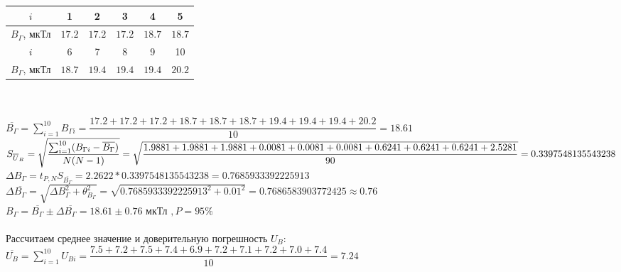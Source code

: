 \begin{tabular}{|c|c|c|c|c|c|}
	\hline
	$ i $        & 1 & 2 & 3 & 4 & 5 \\
	\hline
	$ B_\Gamma $, мкТл & $ 17.2 $ & $ 17.2 $ & $ 17.2 $ & $ 18.7 $ & $ 18.7 $ \\
	\hline
	$ i $        & 6 & 7 & 8 & 9 & 10 \\
	\hline
	$ B_\Gamma $, мкТл & $ 18.7 $ & $ 19.4 $ & $ 19.4 $ & $ 19.4 $ & $ 20.2 $ \\
	\hline
\end{tabular}
\\ 
\\

$ 
\overline{B_{\Gamma}}= 
\sum_{i=1}^{10} B_{\Gamma i} = 
\dfrac{17.2 + 17.2 + 17.2 + 18.7 + 18.7 + 18.7 + 19.4 + 19.4 + 19.4 + 20.2}{10} 
= 18.61
$
\\

$
S_{\overline U_B} = 
\sqrt{
    \dfrac
    {
        \sum_{i=1}^{10}(B_{\Gamma i} - \overline{B_{\Gamma}})
    }
    {
        N(N-1)
    }
}
=\\
\sqrt{
    \dfrac
    {
        1.9881 + 1.9881 + 1.9881 + 0.0081 + 0.0081 + 0.0081 + 0.6241 + 0.6241 + 0.6241 + 2.5281
    }
    {
        90
    }
}
=\\
0.3397548135543238
$
\\

$ 
\varDelta B_{\Gamma} = 
t_{P,N}S_{\overline{B_{\Gamma}}} = 
2.2622 * 0.3397548135543238 = 
0.7685933392225913
$
\\

$ 
\varDelta \overline{B_{\Gamma}} = 
\sqrt{\varDelta B_{\Gamma}^2 + \theta_{B_{\Gamma}}^2} =
\sqrt{0.7685933392225913^2 + 0.01^2} = 
0.7686583903772425 \approx 
0.76
$
\\

$ B_{\Gamma} = 
\overline{B_{\Gamma}} \pm \varDelta \overline{B_{\Gamma}} = 
18.61 \pm 0.76 $ мкТл $, P = 95\%
$
\\

\ \\

Рассчитаем среднее значение и доверительную погрешность $ U_B $:\\

$ 
\overline{U_B}= 
\sum_{i=1}^{10} U_{Bi} = 
\dfrac{7.5 + 7.2 + 7.5 + 7.4 + 6.9 + 7.2 + 7.1 + 7.2 + 7.0 + 7.4}{10} 
= 7.24
$
\\

